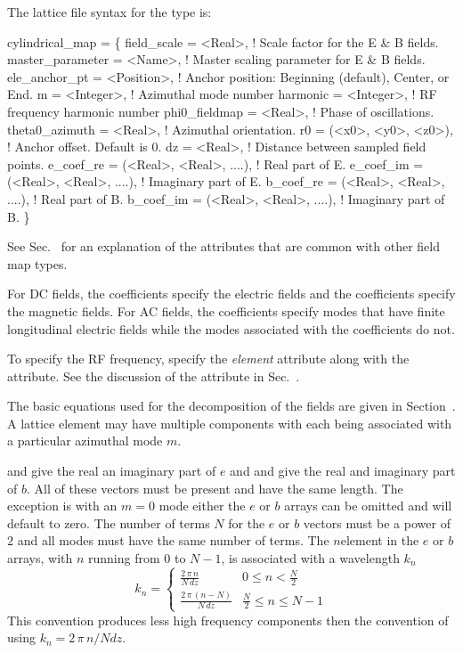 The lattice file syntax for the  type is:
\begin{example}
  cylindrical_map = \{
    field_scale      = <Real>,             ! Scale factor for the E & B fields.
    master_parameter = <Name>,             ! Master scaling parameter for E & B fields.
    ele_anchor_pt    = <Position>,         ! Anchor position: Beginning (default), Center, or End.
    m                = <Integer>,          ! Azimuthal mode number
    harmonic         = <Integer>,          ! RF frequency harmonic number 
    phi0_fieldmap    = <Real>,             ! Phase of oscillations.
    theta0_azimuth   = <Real>,             ! Azimuthal orientation.
    r0               = (<x0>, <y0>, <z0>), ! Anchor offset. Default is 0.
    dz        = <Real>,                    ! Distance between sampled field points.
    e_coef_re = (<Real>, <Real>, ....),    ! Real part of E.
    e_coef_im = (<Real>, <Real>, ....),    ! Imaginary part of E.
    b_coef_re = (<Real>, <Real>, ....),    ! Real part of B.
    b_coef_im = (<Real>, <Real>, ....),    ! Imaginary part of B.
  \}
\end{example}
See Sec.~ for an explanation of the attributes that are common with
other field map types.

For DC fields, the  coefficients specify the electric fields and the  coefficients
specify the magnetic fields. For AC fields, the  coefficients specify modes that have finite
longitudinal electric fields while the modes associated with the  coefficients do not.

To specify the RF frequency, specify the  {\em element} attribute along with
the  attribute. See the discussion of the  attribute in 
Sec.~.

The basic equations used for the  decomposition of the fields are given in
Section~. A lattice element may have multiple 
components with each  being associated with a particular azimuthal mode $m$.

 and  give the real an imaginary part of $e$ and  and  give the
real and imaginary part of $b$. All of these vectors must be present and have the same length. The
exception is with an $m = 0$ mode either the $e$ or $b$ arrays can be omitted and will default to
zero. The number of terms $N$ for the $e$ or $b$ vectors must be a power of $2$ and all modes must
have the same number of terms. The $n$\Th element in the $e$ or $b$ arrays, with $n$ running from 0
to $N-1$, is associated with a wavelength $k_n$
\begin{equation}
  k_n = \begin{cases}
    \frac{2 \, \pi \, n}{N \, dz} & 0 \le n < \frac{N}{2} \\
    \frac{2 \, \pi \, (n-N)}{N \, dz} & \frac{N}{2} \le n \le N - 1
  \end{cases}
\end{equation}
This convention produces less high frequency components then the convention of using $k_n = 2 \, \pi
\, n / N dz$.

